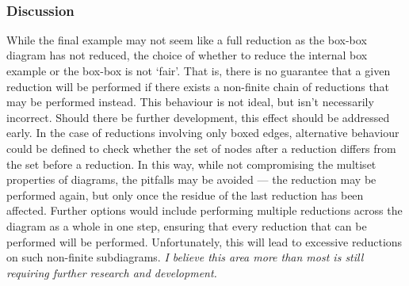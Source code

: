 \begin{examples}{~\\}
\begin{figure}[H]
\begin{subfigure}{0.4\linewidth}
                \end{subfigure}
            \end{figure}
        \end{examples}


    \subsubsection{Discussion}
        While the final example may not seem like a full reduction as the box-box diagram has not reduced, the choice of whether to reduce the internal box example or the box-box is not `fair'.
        That is, there is no guarantee that a given reduction will be performed if there exists a non-finite chain of reductions that may be performed instead.
        This behaviour is not ideal, but isn't necessarily incorrect.
        Should there be further development, this effect should be addressed early.
        In the case of reductions involving only boxed edges, alternative behaviour could be defined to check whether the set of nodes after a reduction differs from the set before a reduction.
        In this way, while not compromising the multiset properties of diagrams, the pitfalls may be avoided --- the reduction may be performed again, but only once the residue of the last reduction has been affected.\footnotemark
        Further options would include performing multiple reductions across the diagram as a whole in one step, ensuring that every reduction that can be performed will be performed.
        Unfortunately, this will lead to excessive reductions on such non-finite subdiagrams.
        \textit{I believe this area more than most is still requiring further research and development.}\\

